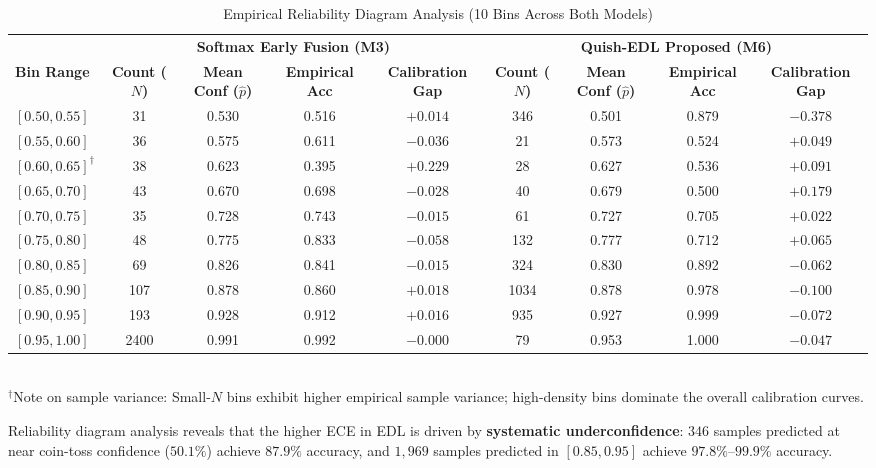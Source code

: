 \documentclass[conference]{IEEEtran}
\begin{document}
\begin{table}[t]
\caption{Empirical Reliability Diagram Analysis (10 Bins Across Both Models)}
\label{tab:reliability}
\centering
\begin{tabular}{lcccccccc}
\toprule
& \multicolumn{4}{c}{\textbf{Softmax Early Fusion (M3)}} & \multicolumn{4}{c}{\textbf{Quish-EDL Proposed (M6)}} \\
\cmidrule(lr){2-5} \cmidrule(lr){6-9}
\textbf{Bin Range} & \textbf{Count ($N$)} & \textbf{Mean Conf ($\hat{p}$)} & \textbf{Empirical Acc} & \textbf{Calibration Gap} & \textbf{Count ($N$)} & \textbf{Mean Conf ($\hat{p}$)} & \textbf{Empirical Acc} & \textbf{Calibration Gap} \\
\midrule
$[0.50, 0.55]$ & 31 & 0.530 & 0.516 & $+0.014$ & 346 & 0.501 & 0.879 & $\mathbf{-0.378}$ \\
$[0.55, 0.60]$ & 36 & 0.575 & 0.611 & $-0.036$ & 21 & 0.573 & 0.524 & $+0.049$ \\
$[0.60, 0.65]^\dagger$ & 38 & 0.623 & 0.395 & $+0.229$ & 28 & 0.627 & 0.536 & $+0.091$ \\
$[0.65, 0.70]$ & 43 & 0.670 & 0.698 & $-0.028$ & 40 & 0.679 & 0.500 & $+0.179$ \\
$[0.70, 0.75]$ & 35 & 0.728 & 0.743 & $-0.015$ & 61 & 0.727 & 0.705 & $+0.022$ \\
$[0.75, 0.80]$ & 48 & 0.775 & 0.833 & $-0.058$ & 132 & 0.777 & 0.712 & $+0.065$ \\
$[0.80, 0.85]$ & 69 & 0.826 & 0.841 & $-0.015$ & 324 & 0.830 & 0.892 & $-0.062$ \\
$[0.85, 0.90]$ & 107 & 0.878 & 0.860 & $+0.018$ & 1034 & 0.878 & 0.978 & $\mathbf{-0.100}$ \\
$[0.90, 0.95]$ & 193 & 0.928 & 0.912 & $+0.016$ & 935 & 0.927 & 0.999 & $\mathbf{-0.072}$ \\
$[0.95, 1.00]$ & 2400 & 0.991 & 0.992 & $\mathbf{-0.000}$ & 79 & 0.953 & 1.000 & $-0.047$ \\
\bottomrule
\end{tabular}
\vspace{1mm}
\\
\footnotesize{$^\dagger$Note on sample variance: Small-$N$ bins exhibit higher empirical sample variance; high-density bins dominate the overall calibration curves.}
\end{table}

Reliability diagram analysis reveals that the higher ECE in EDL is driven by \textbf{systematic underconfidence}: $346$ samples predicted at near coin-toss confidence ($50.1\%$) achieve $87.9\%$ accuracy, and $1,969$ samples predicted in $[0.85, 0.95]$ achieve $97.8\%\text{--}99.9\%$ accuracy.
\end{document}
